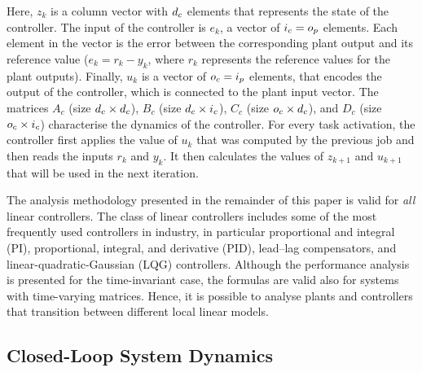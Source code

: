 Here, $z_k$ is a column vector with $d_c$ elements that represents the state of the controller.
The input of the controller is $e_k$, a vector of $i_c = o_p$ elements.
Each element in the vector is the error between the corresponding plant output and its reference value ($e_k = r_k - y_k$, where $r_k$ represents the reference values for the plant outputs).
Finally, $u_k$ is a vector of $o_c = i_p$ elements, that encodes the output of the controller, which is connected to the plant input vector.
The matrices $A_c$ (size $d_c \times d_c$), $B_c$ (size $d_c \times i_c$), $C_c$ (size $o_c \times d_c$), and $D_c$ (size $o_c \times i_c$) characterise the dynamics of the controller.
For every task activation, the controller first applies the value of $u_k$ that was computed by the previous job and then reads the inputs $r_k$ and $y_k$.
It then calculates the values of $z_{k+1}$ and $u_{k+1}$ that will be used in the next iteration.

The analysis methodology presented in the remainder of this paper is valid for \emph{all} linear controllers.
The class of linear controllers includes some of the most frequently used controllers in industry, in particular proportional and integral (PI), proportional, integral, and derivative (PID), lead--lag compensators, and linear-quadratic-Gaussian (LQG) controllers.
Although the performance analysis is presented for the time-invariant case, the formulas are valid also for systems with time-varying matrices.
Hence, it is possible to analyse plants and controllers that transition between different local linear models.

\subsection{Closed-Loop System Dynamics}
\label{sec:cldynamics}

